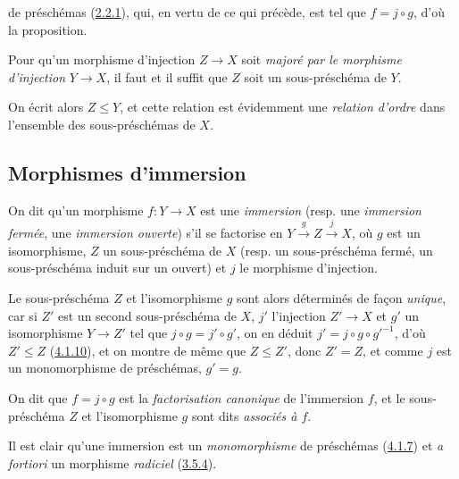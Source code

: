 de préschémas (\hyperref[I.2.2.1-fr]{2.2.1}), qui, en vertu de ce qui précède,
est tel que $f=j\circ g$, d'où la proposition.

\begin{corollary}[4.1.10]
\label{I.4.1.10-fr}
Pour qu'un morphisme d'injection $Z\to X$ soit \emph{majoré par le morphisme
d'injection} $Y\to X$, il faut et il suffit que $Z$ soit un sous-préschéma de
$Y$.
\end{corollary}

On écrit alors $Z\leq Y$, et cette relation est évidemment une
\emph{relation d'ordre} dans l'ensemble des sous-préschémas de $X$.

\subsection{Morphismes d'immersion}
\label{subsection:I.4.2-fr}

\begin{definition}[4.2.1]
\label{I.4.2.1-fr}
On dit qu'un morphisme $f:Y\to X$ est une \emph{immersion} (resp. une
\emph{immersion fermée}, une \emph{immersion ouverte}) s'il se factorise en
$Y\xrightarrow{g}Z\xrightarrow{j}X$, où $g$ est un isomorphisme, $Z$ un
sous-préschéma de $X$ (resp. un sous-préschéma fermé, un sous-préschéma induit
sur un ouvert) et $j$ le morphisme d'injection.
\end{definition}

Le sous-préschéma $Z$ et l'isomorphisme $g$ sont alors déterminés de façon
\emph{unique}, car si $Z'$ est un second sous-préschéma de $X$, $j'$ l'injection
$Z'\to X$ et $g'$ un isomorphisme $Y\to Z'$ tel que
$j\circ g=j'\circ g'$, on en déduit $j'=j\circ g\circ {g'}^{-1}$, d'où
$Z'\leq Z$ (\hyperref[I.4.1.10-fr]{4.1.10}), et on montre de même que
$Z\leq Z'$, donc $Z'=Z$, et comme $j$ est un monomorphisme de préschémas,
$g'=g$.

On dit que $f=j\circ g$ est la \emph{factorisation canonique} de l'immersion
$f$, et le sous-préschéma $Z$ et l'isomorphisme $g$ sont dits
\emph{associés à $f$}.

Il est clair qu'une immersion est un \emph{monomorphisme} de préschémas
(\hyperref[I.4.1.7-fr]{4.1.7}) et \emph{a fortiori} un morphisme
\emph{radiciel} (\hyperref[I.3.5.4-fr]{3.5.4}).

